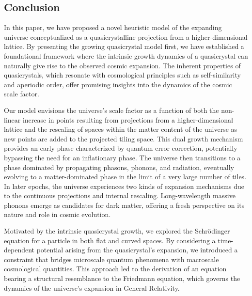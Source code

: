 \documentclass[sn-mathphys-num]{sn-jnl}%
\begin{document}

\subsection{Conclusion}

In this paper, we have proposed a novel heuristic model of the expanding universe conceptualized as a quasicrystalline projection from a higher-dimensional lattice. By presenting the growing quasicrystal model first, we have established a foundational framework where the intrinsic growth dynamics of a quasicrystal can naturally give rise to the observed cosmic expansion. The inherent properties of quasicrystals, which resonate with cosmological principles such as self-similarity and aperiodic order, offer promising insights into the dynamics of the cosmic scale factor.

Our model envisions the universe's scale factor as a function of both the non-linear increase in points resulting from projections from a higher-dimensional lattice and the rescaling of spaces within the matter content of the universe as new points are added to the projected tiling space. This dual growth mechanism provides an early phase characterized by quantum error correction, potentially bypassing the need for an inflationary phase. The universe then transitions to a phase dominated by propagating phasons, phonons, and radiation, eventually evolving to a matter-dominated phase in the limit of a very large number of tiles. In later epochs, the universe experiences two kinds of expansion mechanisms due to the continuous projections and internal rescaling. Long-wavelength massive phonons emerge as candidates for dark matter, offering a fresh perspective on its nature and role in cosmic evolution.

Motivated by the intrinsic quasicrystal growth, we explored the Schr{\"o}dinger equation for a particle in both flat and curved spaces. By considering a time-dependent potential arising from the quasicrystal's expansion, we introduced a constraint that bridges microscale quantum phenomena with macroscale cosmological quantities. This approach led to the derivation of an equation bearing a structural resemblance to the Friedmann equation, which governs the dynamics of the universe's expansion in General Relativity.
\end{document}
